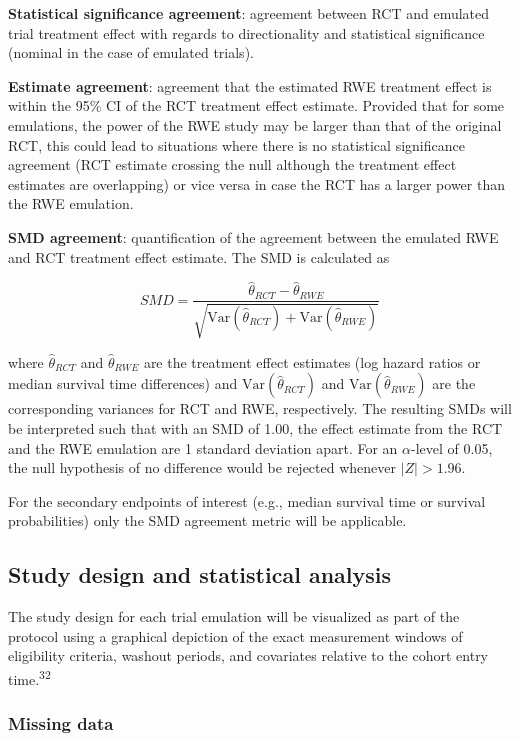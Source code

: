 \documentclass[
  letterpaper,
  DIV=11,
  numbers=noendperiod]{scrartcl}
\begin{document}
\textbf{Statistical significance agreement}: agreement between RCT and
emulated trial treatment effect with regards to directionality and
statistical significance (nominal in the case of emulated trials).

\textbf{Estimate agreement}: agreement that the estimated RWE treatment
effect is within the 95\% CI of the RCT treatment effect estimate.
Provided that for some emulations, the power of the RWE study may be
larger than that of the original RCT, this could lead to situations
where there is no statistical significance agreement (RCT estimate
crossing the null although the treatment effect estimates are
overlapping) or vice versa in case the RCT has a larger power than the
RWE emulation.

\textbf{SMD agreement}: quantification of the agreement between the
emulated RWE and RCT treatment effect estimate. The SMD is calculated as

\[
SMD = \frac{\hat{\theta}_{RCT} - \hat{\theta}_{RWE}}{\sqrt{\text{Var}(\hat{\theta}_{RCT}) + \text{Var}(\hat{\theta}_{RWE})}}
\]

where \(\hat{\theta}_{RCT}\) and \(\hat{\theta}_{RWE}\) are the
treatment effect estimates (log hazard ratios or median survival time
differences) and \(\text{Var}(\hat{\theta}_{RCT})\) and
\(\text{Var}(\hat{\theta}_{RWE})\) are the corresponding variances for
RCT and RWE, respectively. The resulting SMDs will be interpreted such
that with an SMD of 1.00, the effect estimate from the RCT and the RWE
emulation are 1 standard deviation apart. For an \(\alpha\)-level of
0.05, the null hypothesis of no difference would be rejected whenever
\(|Z| > 1.96\).

For the secondary endpoints of interest (e.g., median survival time or
survival probabilities) only the SMD agreement metric will be
applicable.

\subsection{Study design and statistical
analysis}\label{study-design-and-statistical-analysis}

The study design for each trial emulation will be visualized as part of
the protocol using a graphical depiction of the exact measurement
windows of eligibility criteria, washout periods, and covariates
relative to the cohort entry time.\textsuperscript{32}

\subsubsection{Missing data}\label{missing-data}
\end{document}
